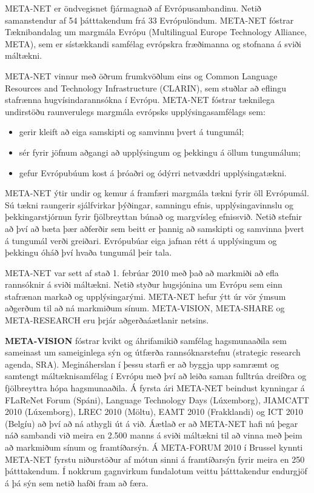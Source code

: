 \documentclass{../../metanetpaper}
\begin{document}
\begin{multicols}{2}

META-NET er öndvegisnet fjármagnað af Evrópusambandinu. Netið samanstendur af 54 þátttakendum frá 33 Evrópulöndum. META-NET fóstrar Tæknibandalag um margmála Evrópu (Multilingual Europe Technology Alliance, META), sem er sístækkandi samfélag evrópskra fræðimanna og stofnana á sviði máltækni.

META-NET vinnur með öðrum frumkvöðlum eins og Common Language Resources and Technology Infrastructure (CLARIN), sem stuðlar að eflingu stafrænna hugvísindarannsókna í Evrópu. META-NET fóstrar tæknilega undirstöðu raunverulegs margmála evrópsks upplýsingasamfélags sem:

\begin{itemize}
\item gerir kleift að eiga samskipti og samvinnu þvert á tungumál;
\item sér fyrir jöfnum aðgangi að upplýsingum og þekkingu á öllum tungumálum;
\item gefur Evrópubúum kost á þróaðri og ódýrri netvæddri upplýsingatækni.
\end{itemize}

META-NET ýtir undir og kemur á framfæri margmála tækni fyrir öll Evrópumál. Sú tækni raungerir sjálfvirkar þýðingar, samningu efnis, upplýsingavinnslu og þekkingarstjórnun fyrir fjölbreyttan búnað og margvísleg efnissvið. Netið stefnir að því að bæta þær aðferðir sem beitt er þannig að samskipti og samvinna þvert á tungumál verði greiðari. Evrópubúar eiga jafnan rétt á upplýsingum og þekkingu óháð því hvaða tungumál þeir tala.

META-NET var sett af stað 1. febrúar 2010 með það að markmiði að efla rannsóknir á sviði máltækni. Netið styður hugsjónina um Evrópu sem einn stafrænan markað og upplýsingarými. META-NET hefur ýtt úr vör ýmsum aðgerðum til að ná markmiðum sínum. META-VISION, META-SHARE og META-RESEARCH eru þrjár aðgerðaáætlanir netsins.

\textbf{META-VISION} fóstrar kvikt og áhrifamikið samfélag hagsmunaaðila sem sameinast um sameiginlega sýn og útfærða rannsóknarstefnu (strategic research agenda, SRA). Megináherslan í þessu starfi er að byggja upp samræmt og samtengt máltæknisamfélag í Evrópu með því að leiða saman fulltrúa dreifðra og fjölbreyttra hópa hagsmunaaðila. Á fyrsta ári META-NET beindust kynningar á FLaReNet Forum (Spáni), Language Technology Days (Lúxemborg), JIAMCATT 2010 (Lúxemborg), LREC 2010 (Möltu), EAMT 2010 (Frakklandi) og ICT 2010 (Belgíu) að því að ná athygli út á við. Áætlað er að META-NET hafi nú þegar náð sambandi við meira en 2.500 manns á sviði máltækni til að vinna með þeim að markmiðum sínum og framtíðarsýn. Á META-FORUM 2010 í Brussel kynnti META-NET fyrstu niðurstöður af mótun sinni á framtíðarsýn fyrir meira en 250 þátttakendum. Í nokkrum gagnvirkum fundalotum veittu þátttakendur endurgjöf á þá sýn sem netið hafði fram að færa. 


\end{multicols}
\end{document}

